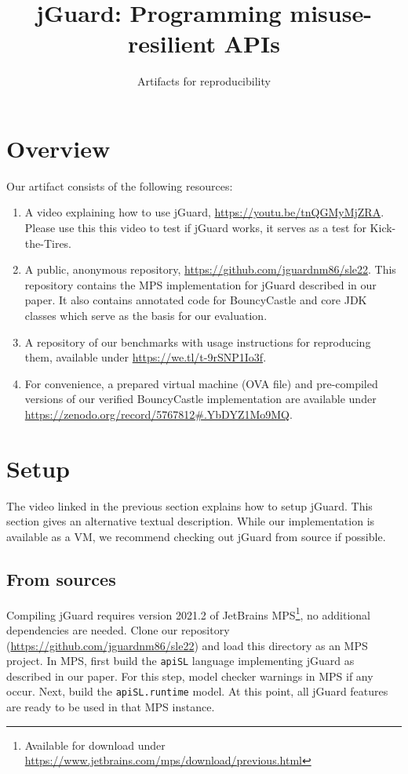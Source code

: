 \documentclass[parskip=full]{scrreprt}
\title{jGuard: Programming misuse-resilient APIs}
\subtitle{Artifacts for reproducibility}
\begin{document}
\maketitle
\setcounter{chapter}{1}

\section{Overview}

Our artifact consists of the following resources:

\begin{enumerate}
 \item A video explaining how to use jGuard, \url{https://youtu.be/tnQGMyMjZRA}.
 Please use this this video to test if jGuard works, it serves as a test for Kick-the-Tires.
 \item A public, anonymous repository, \url{https://github.com/jguardnm86/sle22}.
 This repository contains the MPS implementation for jGuard described in our paper.
 It also contains annotated code for BouncyCastle and core JDK classes which serve as the
 basis for our evaluation.
 \item A repository of our benchmarks with usage instructions for reproducing them, available
 under \url{https://we.tl/t-9rSNP1Io3f}.
 \item For convenience, a prepared virtual machine (OVA file) and pre-compiled versions of our verified BouncyCastle implementation are available under \url{https://zenodo.org/record/5767812#.YbDYZ1Mo9MQ}.
\end{enumerate}

\section{Setup}

The video linked in the previous section explains how to setup jGuard. This section gives
an alternative textual description.
While our implementation is available as a VM, we recommend checking out jGuard from source if
possible.

\subsection{From sources}

Compiling jGuard requires version 2021.2 of JetBrains MPS\footnote{Available for download under \url{https://www.jetbrains.com/mps/download/previous.html}}, no additional dependencies are needed.
Clone our repository (\url{https://github.com/jguardnm86/sle22}) and load this
directory as an MPS project.
In MPS, first build the \texttt{apiSL} language implementing jGuard as described in our paper.
For this step, model checker warnings in MPS if any occur.
Next, build the \texttt{apiSL.runtime} model. At this point, all jGuard features are ready to be used in that MPS instance.
\end{document}
